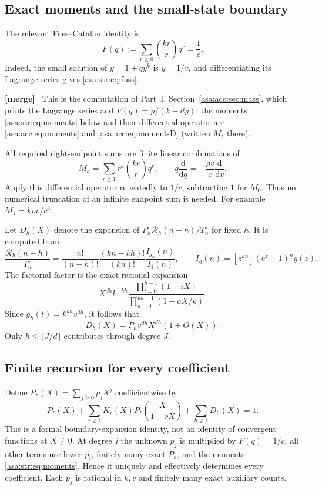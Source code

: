 \documentclass[11pt,letterpaper]{article}
\theoremstyle{remark}\newtheorem{remark}[theorem]{Remark}
\numberwithin{equation}{section}
\newcommand{\ee}{\mathrm e}
\newenvironment{mergenote}{\par\smallskip\begingroup\small
 \noindent\textbf{[merge]}\ }{\par\endgroup\smallskip}
\begin{document}
\subsection{Exact moments and the small-state boundary}
The relevant Fuss--Catalan identity is
\begin{equation}\label{asa:str:eq:fuss}
 F(q):=\sum_{r\ge0}\binom{kr}r q^r=\frac1c.
\end{equation}
Indeed, the small solution of $y=1+qy^k$ is $y=1/v$, and differentiating its Lagrange series gives \eqref{asa:str:eq:fuss}.
\begin{mergenote}
This is the computation of Part~I, Section~\ref{asa:acc:sec:mass}, which
prints the Lagrange series and $F(q)=y/(k-dy)$; the moments
\eqref{asa:str:eq:moments} below and their differential operator are
\eqref{asa:acc:eq:moments} and \eqref{asa:acc:eq:moment-D} (written $M_\ell$
there).
\end{mergenote}
\noindent All required right-endpoint sums are finite linear combinations of
\begin{equation}\label{asa:str:eq:moments}
 M_a=\sum_{r\ge1}r^a\binom{kr}r q^r,
 \qquad q\frac{\mathrm d}{\mathrm d q}=-\frac{\rho v}{c}\frac{\mathrm d}{\mathrm d v}.
\end{equation}
Apply this differential operator repeatedly to $1/c$, subtracting $1$ for $M_0$. Thus no numerical truncation of an infinite endpoint sum is needed. For example $M_1=k\rho v/c^3$.

Let $D_h(X)$ denote the expansion of $P_h\mathcal R_h(n-h)/T^{\circ}_n$ for fixed $h$. It is computed from
\begin{equation}\label{asa:str:eq:smallratio}
 \frac{\mathcal R_h(n-h)}{T^{\circ}_n}
 =\frac{n!}{(n-h)!}\frac{(kn-kh)!}{(kn)!}
 \frac{I_{g_h}(n)}{I_1(n)},\qquad
 I_g(n)=[z^{kn}](\ee^z-1)^ng(z).
\end{equation}
The factorial factor is the exact rational expansion
\[
 X^{dh}k^{-kh}
 \frac{\prod_{i=0}^{h-1}(1-iX)}{\prod_{a=0}^{kh-1}(1-aX/k)}.
\]
Since $g_h(t)=k^{kh}v^{dh}$, it follows that
\begin{equation}\label{asa:str:eq:Dh}
 D_h(X)=P_hv^{dh}X^{dh}(1+O(X)).
\end{equation}
Only $h\le\lfloor J/d\rfloor$ contributes through degree $J$.

\subsection{Finite recursion for every coefficient}
Define $P_*(X)=\sum_{j\ge0}p_jX^j$ coefficientwise by
\begin{equation}\label{asa:str:eq:Pformal}
 P_*(X)+\sum_{r\ge1}K_r(X)P_*\left(\frac X{1-rX}\right)
 +\sum_{h\ge1}D_h(X)=1.
\end{equation}
This is a formal boundary-expansion identity, not an identity of convergent functions at $X\ne0$. At degree $j$ the unknown $p_j$ is multiplied by $F(q)=1/c$; all other terms use lower $p_i$, finitely many exact $P_h$, and the moments \eqref{asa:str:eq:moments}. Hence it uniquely and effectively determines every coefficient. Each $p_j$ is rational in $k,v$ and finitely many exact auxiliary counts.
\end{document}
